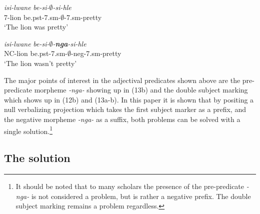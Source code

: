 \documentclass[output=paper]{langsci/langscibook}
\newcommand{\nga}[0]{\textit {-nga- }}
\begin{document}
\begin{exe}
\ex \begin{xlist}
\ex \gll \textit{isi-lwane} \textit{be-si-$\emptyset$-si-hle}\\
       7-lion be.{\sc pst}-7.{\sc sm}-$\emptyset$-7.{\sc sm}-pretty\\
    \glt `The lion was pretty' 

\ex \gll \textit{isi-lwane} \textit{be-si-$\emptyset$-\textbf{nga}-si-hle}\\
       NC-lion be.{\sc pst}-7.{\sc sm}-$\emptyset$-{\sc neg}-7.{\sc sm}-pretty\\
    \glt `The lion wasn't pretty' 
\end{xlist}
\end{exe}

The major points of interest in the adjectival predicates shown above are the pre-predicate morpheme \nga showing up in (13b) and the double subject marking which shows up in (12b) and (13a-b). In this paper it is shown that by positing a null verbalizing projection which takes the first subject marker as a prefix, and the negative morpheme \nga as a suffix, both problems can be solved with a single solution.\footnote{It should be noted that to many scholars the presence of the pre-predicate \nga is not considered a problem, but is rather a negative prefix. The double subject marking remains a problem regardless.}

\subsection {The solution}
\end{document}
